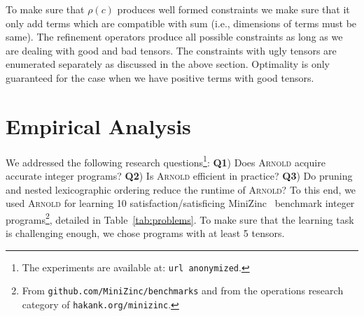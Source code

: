 \documentclass{article}
\newcommand{\learner}{\textsc{Arnold}\xspace}
\renewcommand\[{\begin{equation}}
\renewcommand\]{\end{equation}}
\begin{document}
\noindent
To make sure that $\rho(c)$ produces well formed constraints we make sure that it only add terms which are compatible with sum (i.e., dimensions of terms must be same). The refinement operators produce all possible constraints as long as we are dealing with good and bad tensors. The constraints with ugly tensors are enumerated separately as discussed in the above section. Optimality is only guaranteed for the case when we have positive terms with good tensors.

\section{Empirical Analysis}

We addressed the following research questions\footnote{The experiments are
available at: \texttt{url anonymized}.}:
%
\textbf{Q1}) Does \learner acquire accurate integer programs?
%
\textbf{Q2}) Is \learner efficient in practice?
%
\textbf{Q3}) Do pruning and nested lexicographic ordering reduce the runtime of
\learner?
%
To this end, we used \learner for learning 10 satisfaction/satisficing
MiniZinc~\cite{nethercote2007minizinc} benchmark integer programs\footnote{From
\texttt{github.com/MiniZinc/benchmarks} and from the operations research
category of \texttt{hakank.org/minizinc}.}, detailed in
Table~\ref{tab:problems}.  To make sure that the learning task is challenging
enough, we chose programs with at least 5 tensors.
\end{document}
